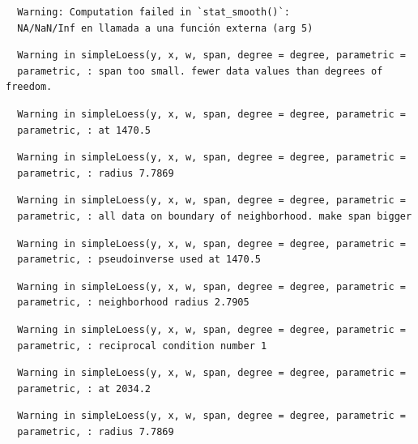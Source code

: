 \documentclass[12pt,twoside]{reedthesis}
\begin{document}
  \begin{verbatim}
  Warning: Computation failed in `stat_smooth()`:
  NA/NaN/Inf en llamada a una función externa (arg 5)
  \end{verbatim}
  
  \begin{verbatim}
  Warning in simpleLoess(y, x, w, span, degree = degree, parametric =
  parametric, : span too small. fewer data values than degrees of freedom.
  \end{verbatim}
  
  \begin{verbatim}
  Warning in simpleLoess(y, x, w, span, degree = degree, parametric =
  parametric, : at 1470.5
  \end{verbatim}
  
  \begin{verbatim}
  Warning in simpleLoess(y, x, w, span, degree = degree, parametric =
  parametric, : radius 7.7869
  \end{verbatim}
  
  \begin{verbatim}
  Warning in simpleLoess(y, x, w, span, degree = degree, parametric =
  parametric, : all data on boundary of neighborhood. make span bigger
  \end{verbatim}
  
  \begin{verbatim}
  Warning in simpleLoess(y, x, w, span, degree = degree, parametric =
  parametric, : pseudoinverse used at 1470.5
  \end{verbatim}
  
  \begin{verbatim}
  Warning in simpleLoess(y, x, w, span, degree = degree, parametric =
  parametric, : neighborhood radius 2.7905
  \end{verbatim}
  
  \begin{verbatim}
  Warning in simpleLoess(y, x, w, span, degree = degree, parametric =
  parametric, : reciprocal condition number 1
  \end{verbatim}
  
  \begin{verbatim}
  Warning in simpleLoess(y, x, w, span, degree = degree, parametric =
  parametric, : at 2034.2
  \end{verbatim}
  
  \begin{verbatim}
  Warning in simpleLoess(y, x, w, span, degree = degree, parametric =
  parametric, : radius 7.7869
  \end{verbatim}
  
\end{document}

